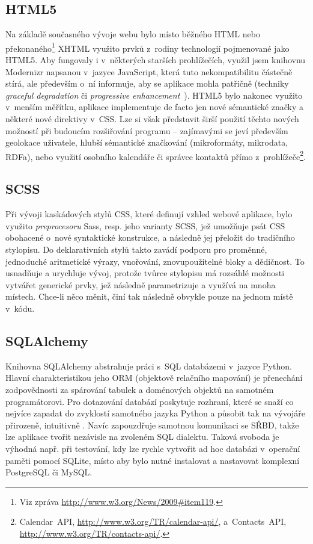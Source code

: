 \documentclass[12pt,oneside,final]{fithesis2}
\begin{document}
\subsection{HTML5}
Na základě současného vývoje webu bylo místo běžného HTML nebo překonaného\footnote{Viz zpráva \url{http://www.w3.org/News/2009\#item119}.} XHTML využito prvků z~rodiny technologií pojmenované jako HTML5. Aby fungovaly i v~některých starších prohlížečích, využil jsem knihovnu Modernizr napsanou v~jazyce JavaScript, která tuto nekompatibilitu částečně stírá, ale především o~ní informuje, aby se aplikace mohla patřičně  (techniky \emph{graceful degradation} či \emph{progressive enhancement}~\cite{heilmann2009graceful}). HTML5 bylo nakonec využito v~menším měřítku, aplikace implementuje de facto jen nové sémantické značky a některé nové direktivy v~CSS. Lze si však představit širší použití těchto nových možností při budoucím rozšiřování programu -- zajímavými se jeví především geolokace uživatele, hlubší sémantické značkování (mikroformáty, mikrodata, RDFa), nebo využití osobního kalendáře či správce kontaktů přímo z~prohlížeče\footnote{Calendar~API, \url{http://www.w3.org/TR/calendar-api/}, a~Contacts~API, \url{http://www.w3.org/TR/contacts-api/}.}.

\subsection{SCSS}
Při vývoji kaskádových stylů CSS, které definují vzhled webové aplikace, bylo využito \emph{preprocesoru} Sass, resp. jeho varianty SCSS, jež umožňuje psát CSS obohacené o~nové syntaktické konstrukce, a následně jej přeložit do tradičního stylopisu. Do deklarativních stylů takto zavádí podporu pro proměnné, jednoduché aritmetické výrazy, vnořování, znovupoužitelné bloky a dědičnost. To usnadňuje a urychluje vývoj, protože tvůrce stylopisu má rozsáhlé možnosti vytvářet generické prvky, jež následně parametrizuje a využívá na mnoha místech. Chce-li něco měnit, činí tak následně obvykle pouze na jednom místě v~kódu.

\subsection{SQLAlchemy}
Knihovna SQLAlchemy abstrahuje práci s~SQL databázemi v~jazyce Python. Hlavní charakteristikou jeho ORM (objektově relačního mapování) je přenechání zodpovědnosti za spárování tabulek a doménových objektů na samotném programátorovi. Pro dotazování databází poskytuje rozhraní, které se snaží co nejvíce zapadat do zvyklostí samotného jazyka Python a působit tak na vývojáře přirozeně, intuitivně \cite{copeland2008essential}. Navíc zapouzdřuje samotnou komunikaci se SŘBD, takže lze aplikace tvořit nezávisle na zvoleném SQL dialektu. Taková svoboda je výhodná např. při testování, kdy lze rychle vytvořit ad hoc databázi v~operační paměti pomocí SQLite, místo aby bylo nutné instalovat a nastavovat komplexní PostgreSQL či MySQL.
\end{document}
